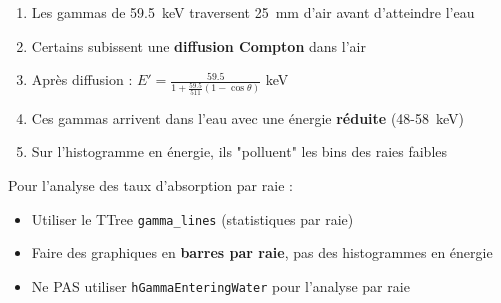 \documentclass[11pt,a4paper]{article}
\begin{document}
\begin{tcolorbox}[colback=blue!5!white, colframe=blue!75!black, title=\textbf{Résumé}]
\begin{enumerate}
    \item Les gammas de 59.5~keV traversent 25~mm d'air avant d'atteindre l'eau
    \item Certains subissent une \textbf{diffusion Compton} dans l'air
    \item Après diffusion : $E' = \frac{59.5}{1 + \frac{59.5}{511}(1-\cos\theta)}$ keV
    \item Ces gammas arrivent dans l'eau avec une énergie \textbf{réduite} (48-58~keV)
    \item Sur l'histogramme en énergie, ils "polluent" les bins des raies faibles
\end{enumerate}
\end{tcolorbox}

\vspace{0.5cm}

\begin{tcolorbox}[colback=green!5!white, colframe=green!75!black, title=\textbf{Recommandation}]
Pour l'analyse des taux d'absorption par raie :
\begin{itemize}
    \item[\ding{51}] Utiliser le TTree \texttt{gamma\_lines} (statistiques par raie)
    \item[\ding{51}] Faire des graphiques en \textbf{barres par raie}, pas des histogrammes en énergie
    \item[\ding{55}] Ne PAS utiliser \texttt{hGammaEnteringWater} pour l'analyse par raie
\end{itemize}
\end{tcolorbox}
\end{document}
